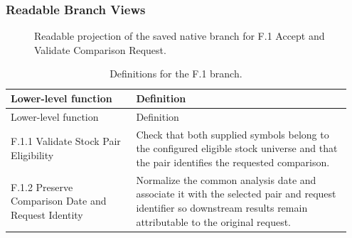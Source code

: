 \documentclass[11pt,letterpaper]{article}
\begin{document}
\subsubsection{Readable Branch Views}
\begin{figure}[H]\centering
{}
\caption{Readable projection of the saved native branch for F.1 Accept and Validate Comparison Request.}\label{fig:branch1}\end{figure}
\begin{longtable}{@{}>{\raggedright\arraybackslash}p{0.35\linewidth}>{\raggedright\arraybackslash}p{0.6\linewidth}@{}}
\caption{Definitions for the F.1 branch.}\\
\toprule Lower-level function & Definition\\\midrule\endfirsthead
\toprule Lower-level function & Definition\\\midrule\endhead
F.1.1 Validate Stock Pair Eligibility & Check that both supplied symbols belong to the configured eligible stock universe and that the pair identifies the requested comparison.\\[5pt]
F.1.2 Preserve Comparison Date and Request Identity & Normalize the common analysis date and associate it with the selected pair and request identifier so downstream results remain attributable to the original request.\\[5pt]
\bottomrule\end{longtable}
\end{document}

